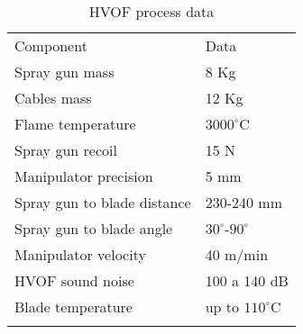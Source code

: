 \begin{table}
\caption{HVOF process data}
\label{tab::hvof}

\begin{tabular}{ll}
\hline\noalign{\smallskip}
Component & Data \\
\noalign{\smallskip}\hline\noalign{\smallskip}
Spray gun mass & 8 Kg  \\
Cables mass & 12 Kg  \\
Flame temperature & $3000^\circ$C \\
Spray gun recoil & 15 N \\
Manipulator precision & 5 mm \\
Spray gun to blade distance & 230-240 mm \\
Spray gun to blade angle & $30^\circ$-$90^\circ$ \\
Manipulator velocity & 40 m/min \\
HVOF sound noise & 100 a 140 dB \\ 
Blade temperature & up to $110^\circ$C \\
\noalign{\smallskip}\hline
\end{tabular}
\end{table}



